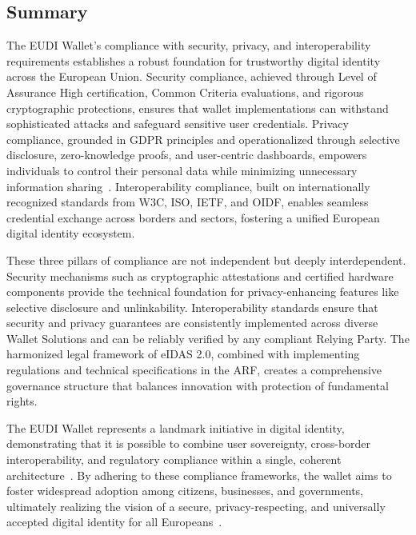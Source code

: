 \documentclass[sigconf,balance,nonacm,authordraft]{acmart}
\begin{document}
\subsection{Summary}

The EUDI Wallet's compliance with security, privacy, and interoperability requirements establishes a robust foundation for trustworthy digital identity across the European Union. Security compliance, achieved through Level of Assurance High certification, Common Criteria evaluations, and rigorous cryptographic protections, ensures that wallet implementations can withstand sophisticated attacks and safeguard sensitive user credentials. Privacy compliance, grounded in GDPR principles and operationalized through selective disclosure, zero-knowledge proofs, and user-centric dashboards, empowers individuals to control their personal data while minimizing unnecessary information sharing~\cite{ISC2_GuidingPrinciples,Potential_PrivacyDesign,Potential_SecurityDesign}. Interoperability compliance, built on internationally recognized standards from W3C, ISO, IETF, and OIDF, enables seamless credential exchange across borders and sectors, fostering a unified European digital identity ecosystem.

These three pillars of compliance are not independent but deeply interdependent. Security mechanisms such as cryptographic attestations and certified hardware components provide the technical foundation for privacy-enhancing features like selective disclosure and unlinkability. Interoperability standards ensure that security and privacy guarantees are consistently implemented across diverse Wallet Solutions and can be reliably verified by any compliant Relying Party. The harmonized legal framework of eIDAS 2.0, combined with implementing regulations and technical specifications in the ARF, creates a comprehensive governance structure that balances innovation with protection of fundamental rights.

The EUDI Wallet represents a landmark initiative in digital identity, demonstrating that it is possible to combine user sovereignty, cross-border interoperability, and regulatory compliance within a single, coherent architecture~\cite{Gataca_ARF_SSI,ISC2_PrivacyDataSovereignty}. By adhering to these compliance frameworks, the wallet aims to foster widespread adoption among citizens, businesses, and governments, ultimately realizing the vision of a secure, privacy-respecting, and universally accepted digital identity for all Europeans~\cite{EU_ARF2024,EU_eIDAS2024}.
\end{document}
